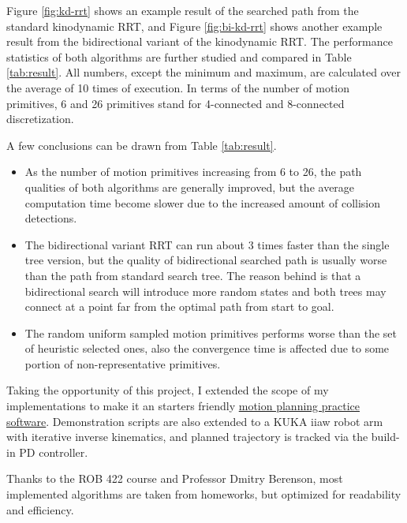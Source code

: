 \documentclass[11pt, conference]{IEEEtran}
\begin{document}
Figure \ref{fig:kd-rrt} shows an example result of the searched path from the standard kinodynamic RRT, and Figure \ref{fig:bi-kd-rrt} shows another example result from the bidirectional variant of the kinodynamic RRT. The performance statistics of both algorithms are further studied and compared in Table \ref{tab:result}. All numbers, except the minimum and maximum, are calculated over the average of 10 times of execution. In terms of the number of motion primitives, 6 and 26 primitives stand for 4-connected and 8-connected discretization.


A few conclusions can be drawn  from Table \ref{tab:result}.
\begin{itemize}
    \item As the number of motion primitives increasing from 6 to 26, the path qualities of both algorithms are generally improved, but the average computation time become slower due to the increased amount of collision detections. 
    \item The bidirectional variant RRT can run about 3 times faster than the single tree version, but the quality of bidirectional searched path is usually worse than the path from standard search tree. The reason behind is that a bidirectional search will introduce more random states and both trees may connect at a point far from the optimal path from start to goal.
    \item The random uniform sampled motion primitives performs worse than the set of heuristic selected ones, also the convergence time is affected due to some portion of non-representative primitives.
\end{itemize}



\FloatBarrier



\newpage
{}

Taking the opportunity of this project, I extended the scope of my implementations to make it an starters friendly \href{https://github.com/silvery107/motion-planning-practice}{motion planning practice software}. Demonstration scripts are also extended to a KUKA iiaw robot arm with iterative inverse kinematics, and planned trajectory is tracked via the build-in PD controller.

Thanks to the ROB 422 course and Professor Dmitry Berenson, most implemented algorithms are taken from homeworks, but optimized for readability and efficiency.
\end{document}
